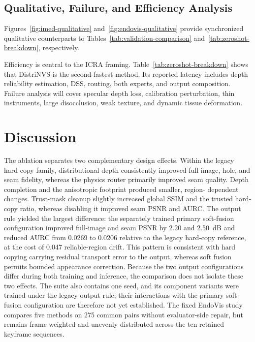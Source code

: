 \documentclass[letterpaper,10pt,conference]{ieeeconf}
\begin{document}
\subsection{Qualitative, Failure, and Efficiency Analysis}

Figures~\ref{fig:imed-qualitative} and~\ref{fig:endovis-qualitative} provide
synchronized qualitative counterparts to Tables~\ref{tab:validation-comparison}
and~\ref{tab:zeroshot-breakdown}, respectively.

Efficiency is central to the ICRA framing. Table~\ref{tab:zeroshot-breakdown}
shows that DistriNVS is the second-fastest method. Its reported latency includes
depth reliability estimation, DSS, routing, both experts, and output
composition. Failure analysis will cover specular depth loss, calibration
perturbation, thin instruments, large disocclusion, weak texture, and dynamic
tissue deformation.

\section{Discussion}
\label{sec:discussion}

The ablation separates two complementary design effects. Within the legacy
hard-copy family, distributional depth consistently improved full-image, hole,
and seam fidelity, whereas the physics router primarily improved seam quality.
Depth completion and the anisotropic footprint produced smaller, region-
dependent changes. Trust-mask cleanup slightly increased global SSIM and the
trusted hard-copy ratio, whereas disabling it improved seam PSNR and AURC.
The output rule yielded the largest difference: the
separately trained primary soft-fusion configuration improved full-image and
seam PSNR by 2.20 and 2.50~dB and reduced AURC from 0.0269 to 0.0206 relative
to the legacy hard-copy reference, at the cost of 0.047 reliable-region drift.
This pattern is consistent with hard copying carrying residual transport error
to the output, whereas soft fusion permits bounded appearance correction.
Because the two output configurations differ during both training and
inference, the comparison does not isolate these two effects. The suite also
contains one seed, and its component variants were trained under the legacy
output rule; their interactions with the primary soft-fusion configuration are
therefore not yet established. The fixed EndoVis study compares five methods
on 275 common pairs without evaluator-side repair, but remains frame-weighted
and unevenly distributed across the ten retained keyframe sequences.
\end{document}
